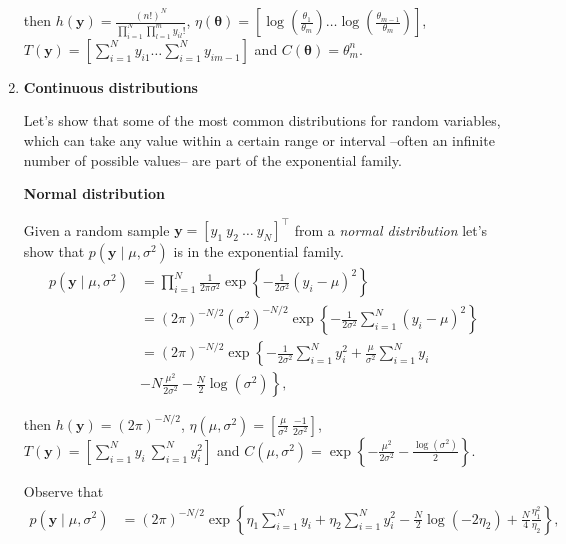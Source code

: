 \begin{enumerate}
then $h(\bm{y})=\frac{(n!)^N}{\prod_{i=1}^N\prod_{l=1}^m y_{il}!}$, $\eta(\bm{\theta})=\left[\log\left(\frac{\theta_1}{\theta_m}\right)\dots \log\left(\frac{\theta_{m-1}}{\theta_m}\right)\right]$, $T(\bm{y})=\left[\sum_{i=1}^N y_{i1}\dots \sum_{i=1}^N y_{im-1}\right]$ and $C(\bm{\theta})=\theta_m^n$.\\

\item \textbf{Continuous distributions}

Let's show that some of the most common distributions for random variables, which can take any value within a certain range or interval --often an infinite number of possible values-- are part of the exponential family.

\textbf{Normal distribution} 

Given a random sample $\bm{y}=[y_1 \ y_2 \ \dots \ y_N]^{\top}$ from a \textit{normal distribution} let's show that $p(\bm{y}\mid \mu,\sigma^2)$ is in the exponential family.
\begin{align}
	p(\bm{y}\mid \mu,\sigma^2)&=\prod_{i=1}^N \frac{1}{2\pi\sigma^2}\exp\left\{-\frac{1}{2\sigma^2}\left(y_i-\mu\right)^2\right\}\nonumber\\
	&= (2\pi)^{-N/2}(\sigma^2)^{-N/2}\exp\left\{-\frac{1}{2\sigma^2}\sum_{i=1}^N\left(y_i-\mu\right)^2\right\}\nonumber\\
	&= (2\pi)^{-N/2}\exp\left\{-\frac{1}{2\sigma^2}\sum_{i=1}^Ny_i^2+\frac{\mu}{\sigma^2}\sum_{i=1}^N y_i\right.\nonumber\\
	&-\left.N\frac{\mu^2}{2\sigma^2}-\frac{N}{2}\log(\sigma^2)\right\}\nonumber,	
\end{align}

then $h(\bm{y})=(2\pi)^{-N/2}$, $\eta(\mu,\sigma^2)=\left[\frac{\mu}{\sigma^2} \ \frac{-1}{2\sigma^2}\right]$, $T(\bm{y})=\left[\sum_{i=1}^N y_i \ \sum_{i=1}^N y_i^2\right]$ and $C(\mu,\sigma^2)=\exp\left\{-\frac{\mu^2}{2\sigma^2}-\frac{\log(\sigma^2)}{2}\right\}$.

Observe that 
\begin{align}
	p(\bm{y}\mid \mu,\sigma^2)&= (2\pi)^{-N/2}\exp\left\{\eta_1\sum_{i=1}^N y_i+\eta_2\sum_{i=1}^Ny_i^2-\frac{N}{2}\log(-2\eta_2)+\frac{N}{4}\frac{\eta_1^2}{\eta_2}\right\}\nonumber,
\end{align}


\end{enumerate}
